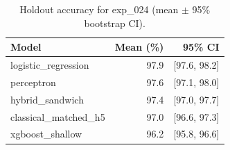 \begin{table}[ht]
\centering
\caption{Holdout accuracy for exp_024 (mean $\pm$ 95\% bootstrap CI).}
\label{tab:exp_024}
\begin{tabular}{lrr}
\toprule
Model & Mean (\%) & 95\% CI \\
\midrule
logistic\_regression & 97.9 & [97.6, 98.2] \\
perceptron & 97.6 & [97.1, 98.0] \\
hybrid\_sandwich & 97.4 & [97.0, 97.7] \\
classical\_matched\_h5 & 97.0 & [96.6, 97.3] \\
xgboost\_shallow & 96.2 & [95.8, 96.6] \\
\bottomrule
\end{tabular}
\end{table}
